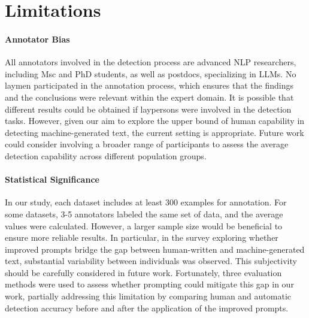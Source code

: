 


\section*{Limitations}
\paragraph{Annotator Bias} 
All annotators involved in the detection process are advanced NLP researchers, including Msc and PhD students, as well as postdocs, specializing in LLMs. No laymen participated in the annotation process, which ensures that the findings and the conclusions were relevant within the expert domain. It is possible that different results could be obtained if laypersons were involved in the detection tasks. However, given our aim to explore the upper bound of human capability in detecting machine-generated text, the current setting is appropriate. Future work could consider involving a broader range of participants to assess the average detection capability across different population groups.


\paragraph{Statistical Significance}
In our study, each dataset includes at least 300 examples for annotation. For some datasets, 3-5 annotators labeled the same set of data, and the average values were calculated. However, a larger sample size would be beneficial to ensure more reliable results. In particular, in the survey exploring whether improved prompts bridge the gap between human-written and machine-generated text, substantial variability between individuals was observed. This subjectivity should be carefully considered in future work. Fortunately, three evaluation methods were used to assess whether prompting could mitigate this gap in our work, partially addressing this limitation by comparing human and automatic detection accuracy before and after the application of the improved prompts.



